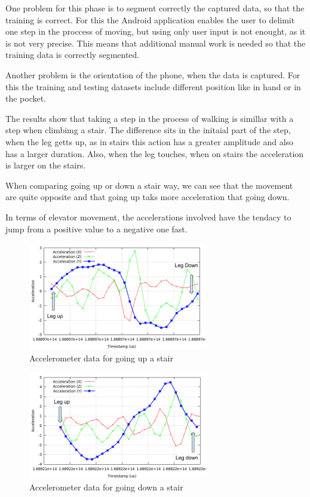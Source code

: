 One problem for this phase is to segment correctly the captured data, so that the training is correct. For this the Android application enables the user to delimit one step in the proccess of moving, but using only user input is not enought, as it is not very precise. This means that additional manual work is needed so that the training data is correctly segmented.

Another problem is the orientation of the phone, when the data is captured. For this the training and testing datasets include different position like in hand or in the pocket.

The results show that taking a step in the process of walking is simillar with a step when climbimg a stair. The difference sits in the initaial part of the step, when the leg getts up, as in stairs this action has a greater amplitude and also has a larger duration. Also, when the leg touches, when on stairs the acceleration is larger on the stairs.

When comparing going up or down a stair way, we can see that the movement are quite opposite and that going up taks more acceleration that going down.

In terms of elevator movement, the accelerations involved have the tendacy to jump from a positive value to a negative one fast.

\begin{figure}
    \centering
    \includegraphics[width=0.7\textwidth]{src/img/xyz-stairs-up.png}
    \caption{Accelerometer data for going up a stair}
    \label{fig:xyz-stairs-up}
\end{figure}
\begin{figure}
    \centering
    \includegraphics[width=0.7\textwidth]{src/img/xyz-stairs-down.png}
    \caption{Accelerometer data for going down a stair}
    \label{fig:xyz-stairs-down}
\end{figure}

